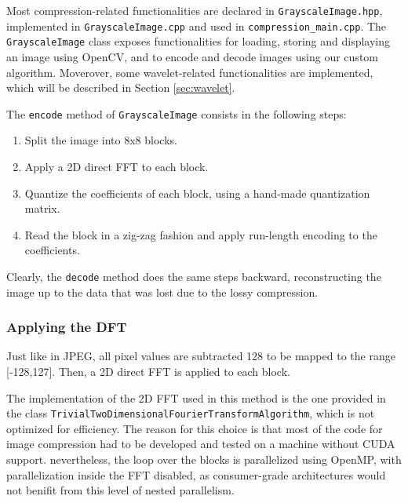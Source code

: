 Most compression-related functionalities are declared in \texttt{Grayscale\-Image.hpp}, implemented in \texttt{Grayscale\-Image.cpp} and used in \texttt{compression\_\-main\-.cpp}. The \texttt{GrayscaleImage} class exposes functionalities for loading, storing and displaying an image using OpenCV, and to encode and decode images using our custom algorithm. Moverover, some wavelet-related functionalities are implemented, which will be described in Section \ref{sec:wavelet}.

The \texttt{encode} method of \texttt{Grayscale\-Image} consists in the following steps:
\begin{enumerate}
    \item Split the image into 8x8 blocks.
    \item Apply a 2D direct FFT to each block.
    \item Quantize the coefficients of each block, using a hand-made quantization matrix.
    \item Read the block in a zig-zag fashion and apply run-length encoding to the coefficients.
\end{enumerate}
Clearly, the \texttt{decode} method does the same steps backward, reconstructing the image up to the data that was lost due to the lossy compression.

\subsubsection{Applying the DFT}
Just like in JPEG, all pixel values are subtracted 128 to be mapped to the range [-128,127]. Then, a 2D direct FFT is applied to each block.

The implementation of the 2D FFT used in this method is the one provided in the class \texttt{Trivial\-Two\-Dimensional\-Fourier\-Transform\-Algorithm}, which is not optimized for efficiency. The reason for this choice is that most of the code for image compression had to be developed and tested on a machine without CUDA support. nevertheless, the loop over the blocks is parallelized using OpenMP, with parallelization inside the FFT disabled, as consumer-grade architectures would not benifit from this level of nested parallelism.

